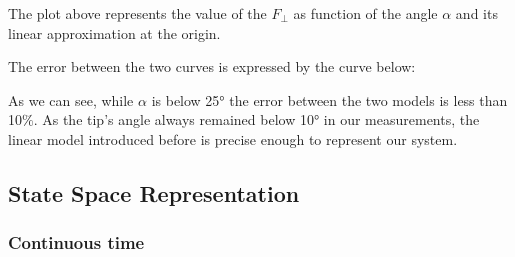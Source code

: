                 

                The plot above represents the value of the $F_\perp$ as function of the angle $\alpha$ and its linear approximation at the origin.

                The error between the two curves is expressed by the curve below:

                As we can see, while $\alpha$ is below 25° the error between the two models is less than 10$\%$. As the tip's angle always remained below 10° in our measurements, the linear model introduced before is precise enough to represent our system.

        \subsection{State Space Representation}
            \subsubsection{Continuous time}

